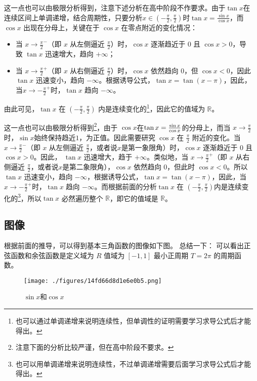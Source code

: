 这一点也可以由极限分析得到，注意下述分析在高中阶段不作要求。由于$\tan x$在连续区间上单调递增，结合周期性，只要分析$\displaystyle x\in(-\frac{\pi}{2},\frac{\pi}{2})$时$\displaystyle\tan x = \frac{\sin x}{\cos x}$，而 $\cos x$ 出现在分母上，关键在于 $\cos x$ 在零点附近的变化情况：
\begin{itemize}
\item 当 $\displaystyle x \to \frac{\pi}{2}^-$（即 $x$ 从左侧逼近 $\frac{\pi}{2}$）时，$\cos x$ 逐渐趋近于 $0$ 且 $\cos x > 0$，导致 $\tan x$ 迅速增大，趋向 $+\infty$；
\item 当 $\displaystyle x \to \frac{\pi}{2}^+$（即 $x$ 从右侧逼近 $\frac{\pi}{2}$）时，$\cos x$ 依然趋向 $0$，但 $\cos x < 0$，因此 $\tan x$ 迅速变小，趋向 $-\infty$。根据诱导公式，$\tan x=\tan(x-\pi)$，因此，当$\displaystyle x \to -\frac{\pi}{2}^+$时，$\tan x$ 趋向 $-\infty$。
\end{itemize}

由此可见，$\tan x$ 在 $\displaystyle (-\frac{\pi}{2},\frac{\pi}{2})$ 内是连续变化的\footnote{也可以通过单调递增来说明连续性，但单调性的证明需要学习求导公式后才能得出。}，因此它的值域为 $\mathbb{R}$。


这一点也可以由极限分析得到\footnote{注意下面的分析比较严谨，但在高中阶段不要求。}，由于 $\cos x$在$\tan x={\sin x\over\cos x}$的分母上，而当 $x \to \frac{\pi}{2}$时，$\sin x $始终保持趋近$1$，为正值。因此需要研究 $\cos x$ 在 $\frac{\pi}{2}$ 附近的变化。当 $x \to \frac{\pi}{2}^-$（即 $x$ 从左侧逼近 $\frac{\pi}{2}$，或者说$x$是第一象限角）时，$\cos x$ 逐渐趋近于 $0$ 且 $\cos x > 0$。因此， $\tan x$ 迅速增大，趋于 $+\infty$。类似地，当 $x \to \frac{\pi}{2}^+$（即 $x$ 从右侧逼近 $\frac{\pi}{2}$，或者说$x$是第二象限角），$\cos x$ 依然趋向 $0$，但此时 $\cos x < 0$。所以 $\tan x$ 迅速变小，趋向 $-\infty$，根据诱导公式，$\tan x=\tan(x-\pi)$，因此，当$x \to -\frac{\pi}{2}^+$时，$\tan x$ 趋向 $-\infty$。而根据前面的分析$\tan x$ 在 $(-\frac{\pi}{2}, \frac{\pi}{2})$内是连续变化的\footnote{也可以用单调递增来说明连续性，不过单调递增需要后面学习求导公式后才能得出。}，所以$\tan x$ 必然遍历整个 $\mathbb{R}$，即它的值域是 $\mathbb{R}$。

\subsection{图像}
根据前面的推导，可以得到基本三角函数的图像如下图。
总结一下：
可以看出正弦函数和余弦函数是定义域为 $R$ 值域为 $[-1,1]$ 最小正周期 $T = 2\pi$ 的周期函数。

\begin{figure}[ht]
\centering
\texttt{[image: ./figures/14fd66d8d1e6e0b5.png]}
\caption{$\sin x$和$\cos x$} \label{fig_HsTFFv_1}
\end{figure}

